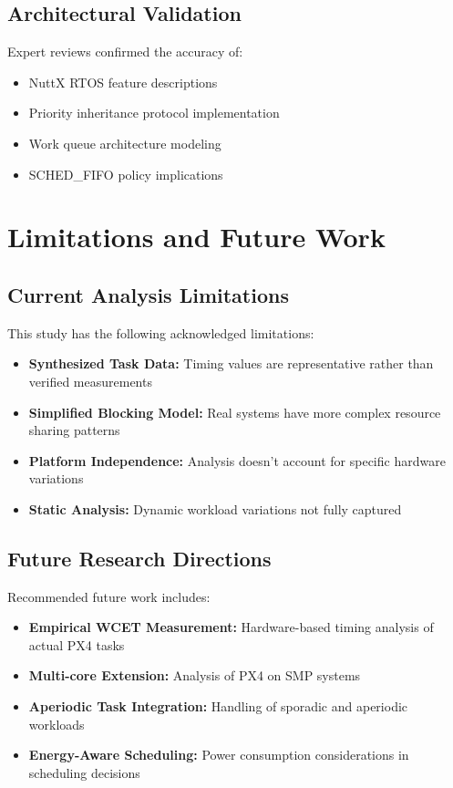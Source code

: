 \documentclass[12pt,a4paper]{article}
\begin{document}
\subsection{Architectural Validation}

Expert reviews confirmed the accuracy of:
\begin{itemize}
\item NuttX RTOS feature descriptions
\item Priority inheritance protocol implementation
\item Work queue architecture modeling
\item SCHED\_FIFO policy implications
\end{itemize}

\section{Limitations and Future Work}

\subsection{Current Analysis Limitations}

This study has the following acknowledged limitations:

\begin{itemize}
\item \textbf{Synthesized Task Data:} Timing values are representative rather than verified measurements
\item \textbf{Simplified Blocking Model:} Real systems have more complex resource sharing patterns
\item \textbf{Platform Independence:} Analysis doesn't account for specific hardware variations
\item \textbf{Static Analysis:} Dynamic workload variations not fully captured
\end{itemize}

\subsection{Future Research Directions}

Recommended future work includes:

\begin{itemize}
\item \textbf{Empirical WCET Measurement:} Hardware-based timing analysis of actual PX4 tasks
\item \textbf{Multi-core Extension:} Analysis of PX4 on SMP systems
\item \textbf{Aperiodic Task Integration:} Handling of sporadic and aperiodic workloads
\item \textbf{Energy-Aware Scheduling:} Power consumption considerations in scheduling decisions
\end{itemize}
\end{document}
